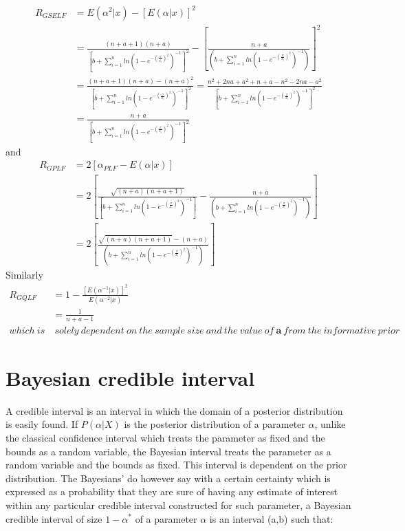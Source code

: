 \documentclass[a4paper,12pt]{report}
\newcommand{\para}{\hspace{0.5cm}}
\begin{document}
\begin{equation}\label{rselfg}
\begin{split}
R_{GSELF}&=E(\alpha^2|x)-\left[E(\alpha|x)\right]^2\\
&=\frac{(n+a+1)(n+a)}{\left[b+\sum\limits_{ i=1 }^{n}ln\left(1-e^{-\left(\frac{\sigma}{x_i}\right)^2}\right)^{-1}\right]^2}-\left[\frac{n+a}{\left(b+\sum\limits_{ i=1 }^{n}ln\left(1-e^{-\left(\frac{\sigma}{x_i}\right)^2}\right)^{-1}\right)}\right]^2\\
&=\frac{(n+a+1)(n+a)-(n+a)^2}{\left[b+\sum\limits_{ i=1 }^{n}ln\left(1-e^{-\left(\frac{\sigma}{x_i}\right)^2}\right)^{-1}\right]^2}=\frac{n^2+2na+a^2+n+a-n^2-2na-a^2}{\left[b+\sum\limits_{ i=1 }^{n}ln\left(1-e^{-\left(\frac{\sigma}{x_i}\right)^2}\right)^{-1}\right]^2}\\
&=\frac{n+a}{\left[b+\sum\limits_{ i=1 }^{n}ln\left(1-e^{-\left(\frac{\sigma}{x_i}\right)^2}\right)^{-1}\right]^2}
\end{split}
\end{equation}
and
\begin{equation}\label{rplfg}
\begin{split}
R_{GPLF}&= 2\left[ {{\alpha _{PLF}} - E\left( {\alpha |x} \right)} \right]\\
&= 2\left[ {\frac{\sqrt{(n+a)(n+a+1)}}{\left[b+\sum\limits_{ i=1 }^{n}ln\left(1-e^{-\left(\frac{\sigma}{x_i}\right)^2}\right)^{-1}\right]} - \frac{n+a}{\left(b+\sum\limits_{ i=1 }^{n}ln\left(1-e^{-\left(\frac{\sigma}{x_i}\right)^2}\right)^{-1}\right)}} \right]\\
&=2\left[\frac{\sqrt{(n+a)(n+a+1)}-(n+a)}{\left(b+\sum\limits_{ i=1 }^{n}ln\left(1-e^{-\left(\frac{\sigma}{x_i}\right)^2}\right)^{-1}\right)}\right]
\end{split}
\end{equation}
Similarly
\begin{equation}\label{rqlfg}
\begin{split}
R_{GQLF}&= 1-\frac{[E(\alpha^{-1}|x)]^2}{E(\alpha^{-2}|x)}\\
&=\frac{1}{n+a-1} \\
 which \ is &\ solely \ dependent\ on \ the \ sample \ size \ and\ the \ value \ of \ \textbf{a}\  from \ the\ informative\ prior
\end{split}
\end{equation}
\section{Bayesian credible interval}
\para A credible interval is an interval in which the domain of a posterior distribution is easily found. If $P(\alpha|X)$ is the posterior distribution of a parameter $\alpha$, unlike the classical confidence interval which treats the parameter as fixed and the bounds as a random variable, the Bayesian interval treats the parameter as a random variable and the bounds as fixed. This interval is dependent on the prior distribution. The Bayesians' do however say with a certain certainty which is expressed as a probability that they are sure of having any estimate of interest within any particular credible interval constructed for such parameter, a Bayesian credible interval of size $1-\alpha^*$ of a parameter $\alpha$ is an interval (a,b) such that:
\end{document}

